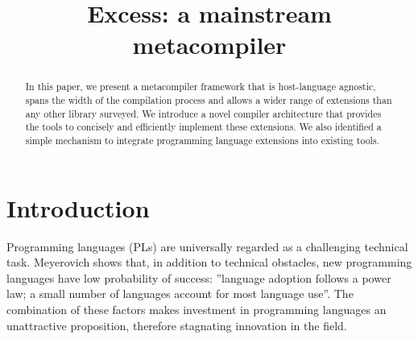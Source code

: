 \documentclass[conference]{IEEEtran}
\begin{document}
\title{Excess: a mainstream metacompiler}


\author{
}

\maketitle

\begin{abstract}
In this paper, we present a metacompiler framework that is host-language agnostic, 
spans the width of the compilation process and allows a wider range of extensions 
than any other library surveyed. We introduce a novel compiler architecture that 
provides the tools to  concisely and efficiently implement these extensions. 
We also identified a simple mechanism to integrate programming language extensions 
into existing tools.

\end{abstract}





%
\IEEEpeerreviewmaketitle



\section{Introduction}

Programming languages (PLs) are universally regarded as a challenging technical task. Meyerovich \cite{Meyerovich}
shows that, in addition to technical obstacles, new programming languages have low probability of success: 
''language adoption follows a power law; a small number of languages account for most language use''. The combination 
of these factors makes investment in programming languages an unattractive proposition, therefore stagnating innovation in the field. 
\end{document}
